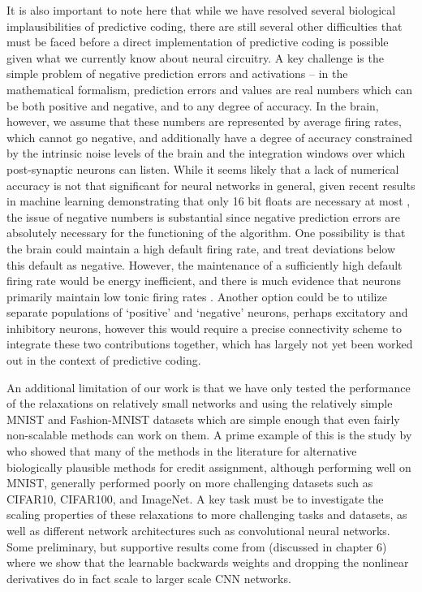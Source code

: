 It is also important to note here that while we have resolved several biological implausibilities of predictive coding, there are still several other difficulties that must be faced before a direct implementation of predictive coding is possible given what we currently know about neural circuitry. A key challenge is the simple problem of negative prediction errors and activations -- in the mathematical formalism, prediction errors and values are real numbers which can be both positive and negative, and to any degree of accuracy. In the brain, however, we assume that these numbers are represented by average firing rates, which cannot go negative, and additionally have a degree of accuracy constrained by the intrinsic noise levels of the brain and the integration windows over which post-synaptic neurons can listen. While it seems likely that a lack of numerical accuracy is not that significant for neural networks in general, given recent results in machine learning demonstrating that only 16 bit floats are necessary at most \citep{gupta2015deep}, the issue of negative numbers is substantial since negative prediction errors are absolutely necessary for the functioning of the algorithm. One possibility is that the brain could maintain a high default firing rate, and treat deviations below this default as negative. However, the maintenance of a sufficiently high default firing rate would be energy inefficient, and there is much evidence that neurons primarily maintain low tonic firing rates \citep{walsh2020evaluating}. Another option could be to utilize separate populations of `positive' and `negative' neurons, perhaps excitatory and inhibitory neurons, however this would require a precise connectivity scheme to integrate these two contributions together, which has largely not yet been worked out in the context of predictive coding. 

An additional limitation of our work is that we have only tested the performance of the relaxations on relatively small networks and using the relatively simple MNIST and Fashion-MNIST datasets which are simple enough that even fairly non-scalable methods can work on them. A prime example of this is the study by \citet{bartunov2018assessing} who showed that many of the methods in the literature for alternative biologically plausible methods for credit assignment, although performing well on MNIST, generally performed poorly on more challenging datasets such as CIFAR10, CIFAR100, and ImageNet. A key task must be to investigate the scaling properties of these relaxations to more challenging tasks and datasets, as well as different network architectures such as convolutional neural networks. Some preliminary, but supportive results come from \citet{millidge2020investigating} (discussed in chapter 6) where we show that the learnable backwards weights and dropping the nonlinear derivatives do in fact scale to larger scale CNN networks.


